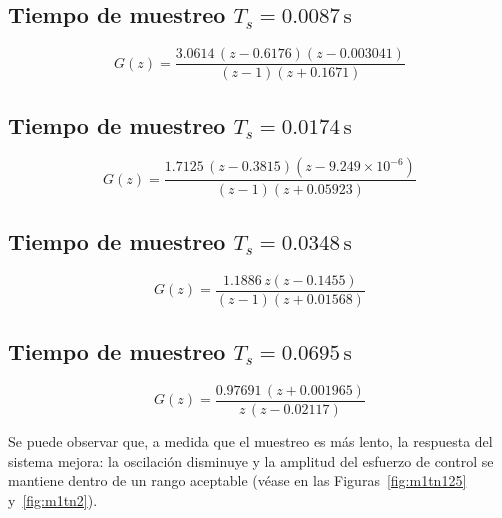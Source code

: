 \subsection*{Tiempo de muestreo $T_s = 0.0087 \, \text{s}$}
\[
G(z) = \frac{3.0614 \, (z - 0.6176)(z - 0.003041)}{(z - 1)(z + 0.1671)}
\]
\subsection*{Tiempo de muestreo $T_s = 0.0174 \, \text{s}$}
\[
G(z) = \frac{1.7125 \, (z - 0.3815)(z - 9.249 \times 10^{-6})}{(z - 1)(z + 0.05923)}
\]

\subsection*{Tiempo de muestreo $T_s = 0.0348 \, \text{s}$}
\[
G(z) = \frac{1.1886 \, z(z - 0.1455)}{(z - 1)(z + 0.01568)}
\]

\subsection*{Tiempo de muestreo $T_s = 0.0695 \, \text{s}$}
\[
G(z) = \frac{0.97691 \, (z + 0.001965)}{z \, (z - 0.02117)}
\]

Se puede observar que, a medida que el muestreo es más lento, la respuesta del sistema mejora: la oscilación disminuye y la amplitud del esfuerzo de control se mantiene dentro de un rango aceptable (véase en las Figuras~\ref{fig:m1tn125} y~\ref{fig:m1tn2}).




